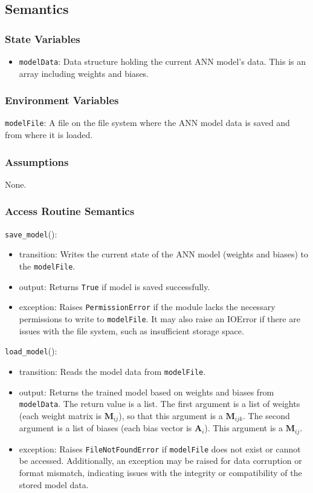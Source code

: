 \documentclass[12pt, titlepage]{article}
\def\code#1{\texttt{#1}}
\begin{document}
\subsection{Semantics}

\subsubsection{State Variables}
\begin{itemize}
  \item \code{modelData}: Data structure holding the current ANN model's data. 
This is an array including weights and biases.
\end{itemize}

\subsubsection{Environment Variables}
\code{modelFile}: A file on the file system where the ANN model data is saved and 
from where it is loaded.

\subsubsection{Assumptions}
None.

\subsubsection{Access Routine Semantics}

\noindent \code{save\_model}():
\begin{itemize}
  \item transition: Writes the current state of the ANN model (weights and biases) to the \code{modelFile}.
  \item output: Returns \code{True} if model is saved successfully.
  \item exception: Raises \code{PermissionError} if the module lacks the necessary permissions to write to \code{modelFile}. 
  It may also raise an IOError if there are issues with the file system, such as insufficient storage space.
\end{itemize}

\noindent \code{load\_model}():
\begin{itemize}
  \item transition: Reads the model data from \code{modelFile}. 
  \item output: Returns the trained model based on weights and biases from \code{modelData}. 
  The return value is a list. The first argument is a list of weights (each weight matrix is $\mathbf{M}_{ij}$), 
  so that this argument is a $\mathbf{M}_{ijk}$. The second argument is a list of biases (each bias vector is $\mathbf{A}_{i}$). 
  This argument is a $\mathbf{M}_{ij}$.
  \item exception: Raises \code{FileNotFoundError} if \code{modelFile} does not exist or cannot be accessed. 
  Additionally, an exception may be raised for data corruption or format mismatch, indicating issues 
  with the integrity or compatibility of the stored model data.
\end{itemize}
\end{document}
